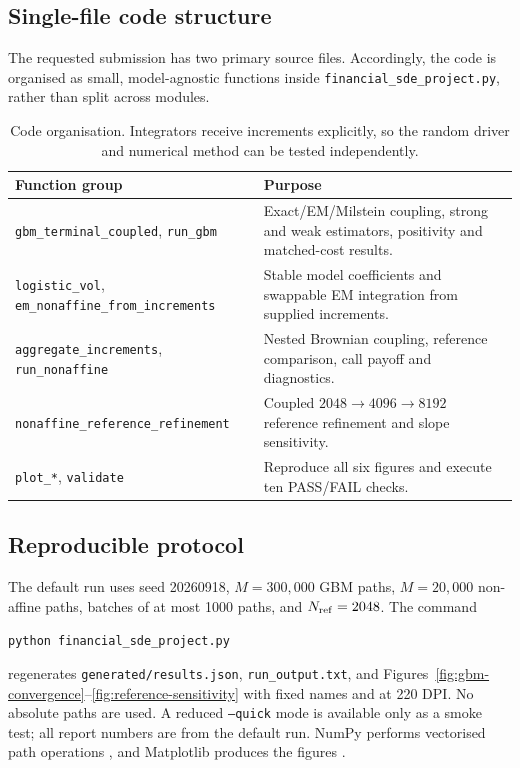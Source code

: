 \documentclass[11pt,a4paper]{article}
\theoremstyle{definition}
\theoremstyle{remark}
\begin{document}
\subsection{Single-file code structure}
The requested submission has two primary source files.  Accordingly, the code
is organised as small, model-agnostic functions inside
\texttt{financial\_sde\_project.py}, rather than split across modules.

\begin{table}[H]
\centering
\small
\begin{tabular}{p{}p{}}
\toprule
\textbf{Function group} & \textbf{Purpose}\\
\midrule
\texttt{gbm\_terminal\_coupled}, \texttt{run\_gbm}
& Exact/EM/Milstein coupling, strong and weak estimators, positivity and matched-cost results.\\
\texttt{logistic\_vol}, \texttt{em\_nonaffine\_from\_increments}
& Stable model coefficients and swappable EM integration from supplied increments.\\
\texttt{aggregate\_increments}, \texttt{run\_nonaffine}
& Nested Brownian coupling, reference comparison, call payoff and diagnostics.\\
\texttt{nonaffine\_reference\_refinement}
& Coupled $2048\rightarrow4096\rightarrow8192$ reference refinement and slope sensitivity.\\
\texttt{plot\_*}, \texttt{validate}
& Reproduce all six figures and execute ten PASS/FAIL checks.\\
\bottomrule
\end{tabular}
\caption{Code organisation.  Integrators receive increments explicitly, so the
random driver and numerical method can be tested independently.}
\label{tab:code-structure}
\end{table}

\subsection{Reproducible protocol}
The default run uses seed 20260918, $M=300{,}000$ GBM paths, $M=20{,}000$
non-affine paths, batches of at most 1000 paths, and $N_{\rm ref}=2048$.  The
command
\begin{center}
\texttt{python financial\_sde\_project.py}
\end{center}
regenerates \texttt{generated/results.json},
\texttt{run\_output.txt}, and Figures~\ref{fig:gbm-convergence}--\ref{fig:reference-sensitivity}
with fixed names and at 220 DPI.  No absolute paths are used.  A reduced
\texttt{--quick} mode is available only as a smoke test; all report numbers are
from the default run.  NumPy performs vectorised path operations
\cite{harris2020}, and Matplotlib produces the figures \cite{hunter2007}.
\end{document}
